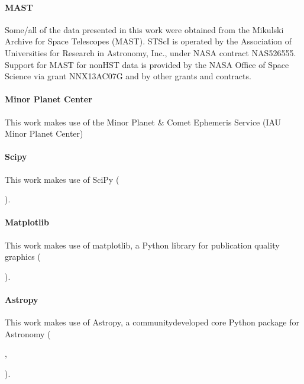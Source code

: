 \documentclass[letterpaper,11pt,english]{sphinxmanual}
\begin{document}
\paragraph{MAST}
\label{\detokenize{user/citations:mast}}
\sphinxAtStartPar
Some/all of the data presented in this work were obtained from the Mikulski
Archive for Space Telescopes (MAST). STScI is operated by the Association of
Universities for Research in Astronomy, Inc., under NASA contract NAS5\sphinxhyphen{}26555.
Support for MAST for non\sphinxhyphen{}HST data is provided by the NASA Office of Space
Science via grant NNX13AC07G and by other grants and contracts.


\paragraph{Minor Planet Center}
\label{\detokenize{user/citations:minor-planet-center}}
\sphinxAtStartPar
This work makes use of the Minor Planet \& Comet Ephemeris Service (IAU Minor
Planet Center)


\paragraph{Scipy}
\label{\detokenize{user/citations:scipy}}
\sphinxAtStartPar
This work makes use of SciPy
(%
\begin{footnote}[11]\sphinxAtStartFootnote
{}
%
\end{footnote}).


\paragraph{Matplotlib}
\label{\detokenize{user/citations:matplotlib}}
\sphinxAtStartPar
This work makes use of matplotlib, a Python library for publication quality
graphics
(%
\begin{footnote}[12]\sphinxAtStartFootnote
{}
%
\end{footnote}).


\paragraph{Astropy}
\label{\detokenize{user/citations:astropy}}
\sphinxAtStartPar
This work makes use of Astropy, a community\sphinxhyphen{}developed core Python package for
Astronomy
(%
\begin{footnote}[13]\sphinxAtStartFootnote
{}
%
\end{footnote}, %
\begin{footnote}[14]\sphinxAtStartFootnote
{}
%
\end{footnote}).
\end{document}
